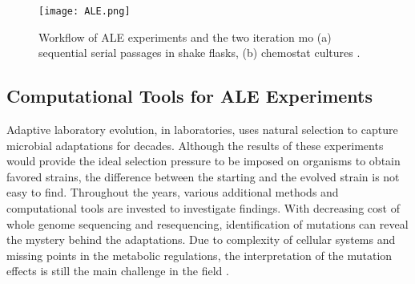 \vspace{0.5cm}
\begin{figure}[H]
\begin{center}
\texttt{[image: ALE.png]}
\caption[Workflow of ALE experiments and the two iteration mo (a) sequential serial passages in shake flasks, (b) chemostat cultures]{Workflow of ALE experiments and the two iteration mo (a) sequential serial passages in shake flasks, (b) chemostat cultures \cite{dragosits2013adaptive, shepelin2018selecting}.}
\label{fig:ale}
\end{center}
\end{figure}
\vspace{-0.5cm}

\subsection{Computational Tools for ALE Experiments}

Adaptive laboratory evolution, in laboratories, uses natural selection to capture microbial adaptations for decades. Although the results of these experiments would provide the ideal selection pressure to be imposed on organisms to obtain favored strains, the difference between the starting and the evolved strain is not easy to find. Throughout the years, various additional methods and computational tools are invested to investigate findings. With decreasing cost of whole genome sequencing and resequencing, identification of mutations can reveal the mystery behind the adaptations. Due to complexity of cellular systems and missing points in the metabolic regulations, the interpretation of the mutation effects is still the main challenge in the field \cite{palsson2011adaptive}.

